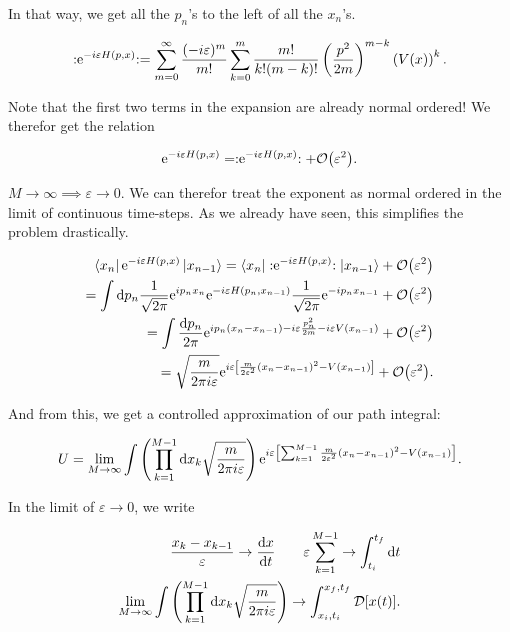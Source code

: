 In that way, we get all the $p_{n}$'s to the left of all the $x_{n}$'s. 

\begin{equation*}
    :\mathrel{\mathrm{e}^{-i\varepsilon H(p,x)}}: = \sum_{m = 0}^{\infty} \frac{(-i\varepsilon)^{m}}{m!} \sum_{k = 0}^{m} \frac{m!}{k! (m - k)!} \left(\frac{p^{2}}{2m}\right)^{m - k} \left(V(x)\right)^{k}.
\end{equation*}

Note that the first two terms in the expansion are already normal ordered! We therefor get the relation 

\begin{equation*}
    \e^{-i\varepsilon H(p,x)} = \normord{\e^{-i\varepsilon H(p,x)}} + \order{\varepsilon^{2}}. 
\end{equation*}

$M \to \infty \implies \varepsilon \to 0$. We can therefor treat the exponent as normal ordered in the limit of continuous time-steps. As we already have seen, this simplifies the problem drastically. 

\begin{align*}
    \bra{x_{n}}\e^{-i\varepsilon H(p,x)}\ket{x_{n-1}} = \bra{x_{n}}\normord{\e^{-i\varepsilon H(p,x)}}\ket{x_{n-1}} + \order{\varepsilon^{2}} \\ = \int \dd p_{n} \frac{1}{\sqrt{2\pi}}\e^{ip_{n}x_{n}}  \e^{-i \varepsilon H(p_{n}, x_{n-1})} \frac{1}{\sqrt{2\pi}} \e^{-ip_{n}x_{n-1}} + \order{\varepsilon^{2}} \\ = \int \frac{\dd p_{n}}{2\pi}  \e^{ip_{n}(x_{n} - x_{n-1}) -i \varepsilon \frac{p_{n}^{2}}{2m} - i\varepsilon V(x_{n-1})} + \order{\varepsilon^{2}} \\ = \sqrt{\frac{m}{2\pi i \varepsilon}}\e^{i\varepsilon \left[\frac{m}{2 \varepsilon^{2}} (x_{n} - x_{n-1})^{2} - V(x_{n-1})\right]} + \order{\varepsilon^{2}}.
\end{align*}

And from this, we get a controlled approximation of our path integral: 

\begin{equation*}
    U = \lim_{M \to \infty} \int \left( \prod_{k = 1}^{M-1} \dd x_{k} \sqrt{\frac{m}{2\pi i \varepsilon}} \right) \mathrm{e}^{i\varepsilon \left[\sum_{k = 1}^{M-1} \frac{m}{2 \varepsilon^{2}} (x_{n} - x_{n-1})^{2} - V(x_{n-1})\right]}. 
\end{equation*}

In the limit of $\varepsilon \to 0$, we write 

\begin{align*}
    \frac{x_{k} - x_{k-1}}{\varepsilon} \to \dv{x}{t} \quad \quad  \varepsilon \sum_{k = 1}^{M-1} \to  \int_{t_{i}}^{t_{f}} \dd t \\ \lim_{M \to \infty} \int \left( \prod_{k = 1}^{M-1} \dd x_{k} \sqrt{\frac{m}{2\pi i \varepsilon}} \right) \to \int_{x_{i}, t_{i}}^{x_{f},t{_f}} \mathcal{D}[x(t)]. 
\end{align*}

